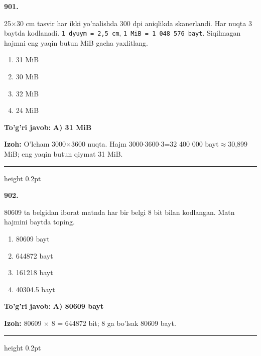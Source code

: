 \documentclass[10pt,a4paper,oneside]{article}
\begin{document}
\noindent\textbf{\color{ink}901.}
\par
25\ensuremath{\times}30 cm tasvir har ikki yo'nalishda 300 dpi aniqlikda skanerlandi. Har nuqta 3 baytda kodlanadi. \texttt{1 dyuym = 2,5 cm}, \texttt{1 MiB = 1 048 576 bayt}. Siqilmagan hajmni eng yaqin butun MiB gacha yaxlitlang.
\begin{enumerate}[label=\Alph*),leftmargin=9mm]
\item 31 MiB
\item 30 MiB
\item 32 MiB
\item 24 MiB
\end{enumerate}
\begin{tcolorbox}[enhanced,breakable,colback=teal!4,colframe=teal!50!black,boxrule=0.5pt,arc=1.1mm,left=3mm,right=3mm,top=1.7mm,bottom=1.7mm,before skip=2mm,after skip=2mm]
\textbf{\color{teal}To'g'ri javob:} \textbf{A) 31 MiB}
\par\smallskip
\textbf{Izoh:} O'lcham 3000\ensuremath{\times}3600 nuqta. Hajm 3000\ensuremath{\cdot}3600\ensuremath{\cdot}3=32 400 000 bayt\ensuremath{\approx}30,899 MiB; eng yaqin butun qiymat 31 MiB.
\end{tcolorbox}
\vspace{2mm}\hrule height 0.2pt \vspace{3mm}

\noindent\textbf{\color{ink}902.}
\par
80609 ta belgidan iborat matnda har bir belgi 8 bit bilan kodlangan. Matn hajmini baytda toping.
\begin{enumerate}[label=\Alph*),leftmargin=9mm]
\item 80609 bayt
\item 644872 bayt
\item 161218 bayt
\item 40304.5 bayt
\end{enumerate}
\begin{tcolorbox}[enhanced,breakable,colback=teal!4,colframe=teal!50!black,boxrule=0.5pt,arc=1.1mm,left=3mm,right=3mm,top=1.7mm,bottom=1.7mm,before skip=2mm,after skip=2mm]
\textbf{\color{teal}To'g'ri javob:} \textbf{A) 80609 bayt}
\par\smallskip
\textbf{Izoh:} 80609 \ensuremath{\times} 8 = 644872 bit; 8 ga bo'lsak 80609 bayt.
\end{tcolorbox}
\vspace{2mm}\hrule height 0.2pt \vspace{3mm}
\end{document}
